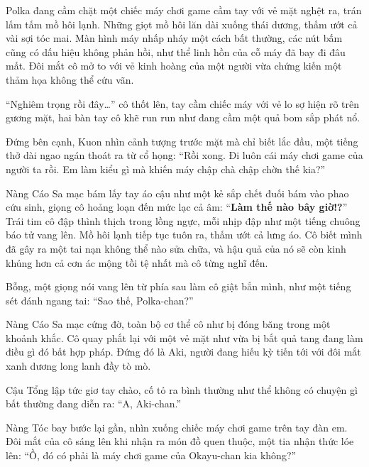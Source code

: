 \documentclass[../main.tex]{subfiles}
\begin{document}

Polka đang cầm chặt một chiếc máy chơi game cầm tay với vẻ mặt nghệt ra, trán lấm tấm mồ hôi lạnh. Những giọt mồ hôi lăn dài xuống thái dương, thấm ướt cả vài sợi tóc mai. Màn hình máy nhấp nháy một cách bất thường, các nút bấm cũng có dấu hiệu không phản hồi, như thể linh hồn của cỗ máy đã bay đi đâu mất. Đôi mắt cô mở to với vẻ kinh hoàng của một người vừa chứng kiến một thảm họa không thể cứu vãn.

``Nghiêm trọng rồi đây\dots'' cô thốt lên, tay cầm chiếc máy với vẻ lo sợ hiện rõ trên gương mặt, hai bàn tay cô khẽ run run như đang cầm một quả bom sắp phát nổ.


Đứng bên cạnh, Kuon nhìn cảnh tượng trước mặt mà chỉ biết lắc đầu, một tiếng thở dài ngao ngán thoát ra từ cổ họng: ``Rồi xong. Đi luôn cái máy chơi game của người ta rồi. Em làm kiểu gì mà khiến máy chập chà chập chờn thế kia?''

Nàng Cáo Sa mạc bám lấy tay áo cậu như một kẻ sắp chết đuối bám vào phao cứu sinh, giọng cô hoảng loạn đến mức lạc cả âm: ``\textbf{Làm thế nào bây giờ!?}''
Trái tim cô đập thình thịch trong lồng ngực, mỗi nhịp đập như một tiếng chuông báo tử vang lên. Mồ hôi lạnh tiếp tục tuôn ra, thấm ướt cả lưng áo. Cô biết mình đã gây ra một tai nạn không thể nào sửa chữa, và hậu quả của nó sẽ còn kinh khủng hơn cả cơn ác mộng tồi tệ nhất mà cô từng nghĩ đến.

Bỗng, một giọng nói vang lên từ phía sau làm cô giật bắn mình, như một tiếng sét đánh ngang tai: ``Sao thế, Polka-chan?''

Nàng Cáo Sa mạc cứng đờ, toàn bộ cơ thể cô như bị đóng băng trong một khoảnh khắc. Cô quay phắt lại với một vẻ mặt như vừa bị bắt quả tang đang làm điều gì đó bất hợp pháp. Đứng đó là Aki, người đang hiếu kỳ tiến tới với đôi mắt xanh dương long lanh đầy tò mò.

Cậu Tổng lập tức giơ tay chào, cố tỏ ra bình thường như thể không có chuyện gì bất thường đang diễn ra: ``A, Aki-chan.''

Nàng Tóc bay bước lại gần, nhìn xuống chiếc máy chơi game trên tay đàn em. Đôi mắt của cô sáng lên khi nhận ra món đồ quen thuộc, một tia nhận thức lóe lên: ``Ồ, đó có phải là máy chơi game của Okayu-chan kia không?''
\end{document}
